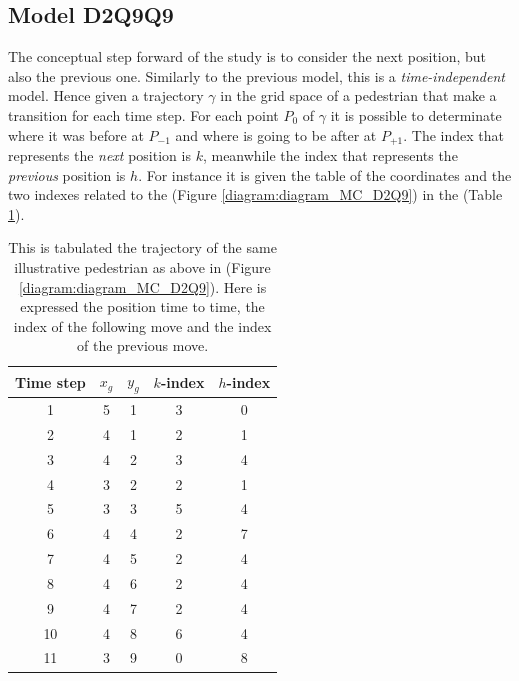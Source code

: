 \documentclass[class=article, crop=false]{standalone}
\begin{document}
\subsection{Model D2Q9Q9}
The conceptual step forward of the study is to consider the next position, but also the previous one.
Similarly to the previous model, this is a \emph{time-independent} model.
Hence given a trajectory $\gamma$ in the grid space of a pedestrian that make a transition for each time step.
For each point $P_0$ of $\gamma$ it is possible to determinate where it was before at $P_{-1}$ and where is going to be after at $P_{+1}$.
The index that represents the \emph{next} position is $k$, meanwhile the index that represents the \emph{previous} position is $h$.
For instance it is given the table of the coordinates and the two indexes related to the (Figure \ref{diagram:diagram_MC_D2Q9}) in the (Table \ref{table:diagram_MC_D2Q9}).
\begin{table}[h!]
\centering
\begin{tabular}{|c|c|c|c|c|}
\hline
Time step & $x_g$ & $y_g$ & $k$-index & $h$-index  \\ \hline
1         & 5 & 1 & 3 & 0 \\ \hline
2         & 4 & 1 & 2 & 1 \\ \hline
3         & 4 & 2 & 3 & 4 \\ \hline
4         & 3 & 2 & 2 & 1 \\ \hline
5         & 3 & 3 & 5 & 4 \\ \hline
6         & 4 & 4 & 2 & 7 \\ \hline
7         & 4 & 5 & 2 & 4 \\ \hline
8         & 4 & 6 & 2 & 4 \\ \hline
9         & 4 & 7 & 2 & 4 \\ \hline
10        & 4 & 8 & 6 & 4 \\ \hline
11        & 3 & 9 & 0 & 8 \\ \hline
\end{tabular}
\captionsetup{width=.6\linewidth}
\caption{This is tabulated the trajectory of the same illustrative pedestrian as above in (Figure \ref{diagram:diagram_MC_D2Q9}).
Here is expressed the position time to time, the index of the following move and the index of the previous move.}
\label{table:diagram_MC_D2Q9}
\end{table}
\end{document}
